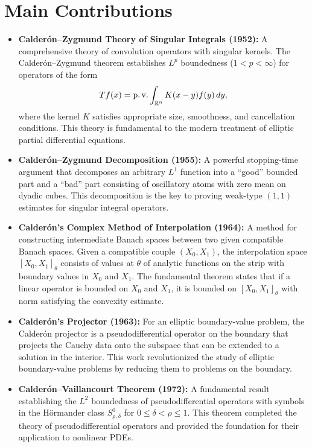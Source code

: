 \section{Main Contributions}

\begin{itemize}
    \item \textbf{Calder\'{o}n--Zygmund Theory of Singular Integrals (1952):} A comprehensive theory of convolution operators with singular kernels. The Calder\'{o}n--Zygmund theorem establishes $L^p$ boundedness ($1 < p < \infty$) for operators of the form
    \[
    Tf(x) = \operatorname{p.v.} \int_{\mathbb{R}^n} K(x-y) f(y) \,dy,
    \]
    where the kernel $K$ satisfies appropriate size, smoothness, and cancellation conditions. This theory is fundamental to the modern treatment of elliptic partial differential equations.

    \item \textbf{Calder\'{o}n--Zygmund Decomposition (1955):} A powerful stopping-time argument that decomposes an arbitrary $L^1$ function into a ``good'' bounded part and a ``bad'' part consisting of oscillatory atoms with zero mean on dyadic cubes. This decomposition is the key to proving weak-type $(1,1)$ estimates for singular integral operators.

    \item \textbf{Calder\'{o}n's Complex Method of Interpolation (1964):} A method for constructing intermediate Banach spaces between two given compatible Banach spaces. Given a compatible couple $(X_0, X_1)$, the interpolation space $[X_0, X_1]_\theta$ consists of values at $\theta$ of analytic functions on the strip with boundary values in $X_0$ and $X_1$. The fundamental theorem states that if a linear operator is bounded on $X_0$ and $X_1$, it is bounded on $[X_0, X_1]_\theta$ with norm satisfying the convexity estimate.

    \item \textbf{Calder\'{o}n's Projector (1963):} For an elliptic boundary-value problem, the Calder\'{o}n projector is a pseudodifferential operator on the boundary that projects the Cauchy data onto the subspace that can be extended to a solution in the interior. This work revolutionized the study of elliptic boundary-value problems by reducing them to problems on the boundary.

    \item \textbf{Calder\'{o}n--Vaillancourt Theorem (1972):} A fundamental result establishing the $L^2$ boundedness of pseudodifferential operators with symbols in the H\"ormander class $S^0_{\rho,\delta}$ for $0 \leq \delta < \rho \leq 1$. This theorem completed the theory of pseudodifferential operators and provided the foundation for their application to nonlinear PDEs.


\end{itemize}
